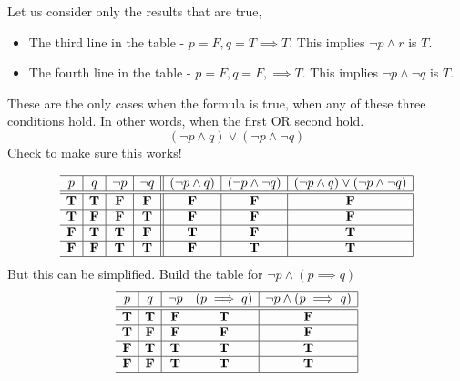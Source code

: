 \begin{problem}
\ifKey
\color{red}
Let us consider only the results that are true, 
\begin{itemize}
\item The third line in the table - $p =F, q = T\implies T$.  This implies $\neg p  \land r$ is $T$.
\item The fourth line in the table - $p =F, q = F, \implies T$.  This implies $\neg p \land  \neg q $ is $T$.
\end{itemize}
These are the only cases when the formula is true, when any of these three conditions hold.  In other words, when the first OR second hold.
$$(\neg p  \land q) \lor (\neg p \land  \neg q)$$
Check to make sure this works!

 $$\begin{array}{c|c|c|c||c|c|c|c}
  \hline  
  p & q &\neg p & \neg q				& (\neg p  \land q)& (\neg p \land  \neg q) &(\neg p  \land q) \lor (\neg p \land  \neg q) \\
  \hline
  \hline
 \mathbf{T} &  \mathbf{T} 	&   \mathbf{F}	&  \mathbf{F}	&  \mathbf{F} 	&  \mathbf{F} 	&	 \mathbf{F} \\
  \hline
 \mathbf{T} &  \mathbf{F} 	&   \mathbf{F}	&  \mathbf{T} 	&  \mathbf{F} 	&  \mathbf{F} 		&	 \mathbf{F} \\
  \hline
 \mathbf{F} &  \mathbf{T} 	&  \mathbf{T}	& \mathbf{F}	&  \mathbf{T} 	&  \mathbf{F} 		& \mathbf{T} 	\\
   \hline
 \mathbf{F} &  \mathbf{F} 	&   \mathbf{T}	&\mathbf{T}	&  \mathbf{F} 	&  \mathbf{T} 		& \mathbf{T} 	\\
    \hline
    \end{array}$$
But this can be simplified.  Build the table for $\neg p \land(p \implies q)$
$$\begin{array}{c|c|c|c|c|}
  \hline  
  p & q &\neg p &(p\implies q)		& \neg p \land (p\implies q)\\
  \hline
  \hline
 \mathbf{T} &  \mathbf{T} 	&   \mathbf{F}	&  \mathbf{T}	&  \mathbf{F}\\
  \hline
 \mathbf{T} &  \mathbf{F} 	&   \mathbf{F}	&  \mathbf{F} &   \mathbf{F}\\
  \hline
 \mathbf{F} &  \mathbf{T} 	&  \mathbf{T}	& \mathbf{T}	&  \mathbf{T} \\
   \hline
 \mathbf{F} &  \mathbf{F} 	&   \mathbf{T}	&\mathbf{T}  &  \mathbf{T} \\
    \hline
    \end{array}$$
\fi
\end{problem}


